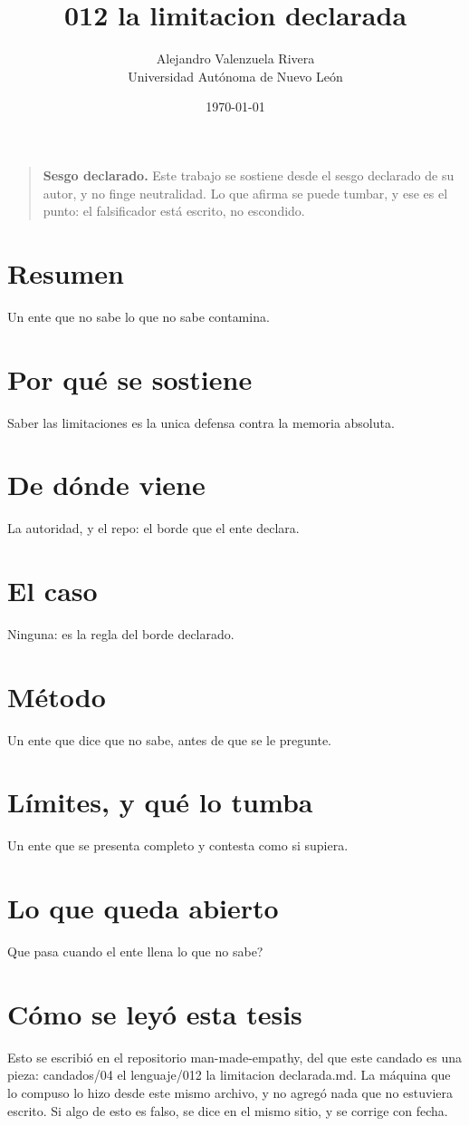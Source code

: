 \documentclass[11pt,a4paper]{article}
\title{012 la limitacion declarada}
\author{Alejandro Valenzuela Rivera\\\small Universidad Autónoma de Nuevo León}
\date{\today}
\begin{document}
\maketitle

\begin{quote}
\textbf{Sesgo declarado.} Este trabajo se sostiene desde el sesgo declarado de su autor, y no finge neutralidad. Lo que afirma se puede tumbar, y ese es el punto: el falsificador está escrito, no escondido.
\end{quote}

\section*{Resumen}
Un ente que no sabe lo que no sabe contamina.

\section{Por qué se sostiene}
Saber las limitaciones es la unica defensa contra la memoria absoluta.

\section{De dónde viene}
La autoridad, y el repo: el borde que el ente declara.

\section{El caso}
Ninguna: es la regla del borde declarado.

\section{Método}
Un ente que dice que no sabe, antes de que se le pregunte.

\section{Límites, y qué lo tumba}
Un ente que se presenta completo y contesta como si supiera.

\section{Lo que queda abierto}
\textquestiondown{}Que pasa cuando el ente llena lo que no sabe?

\section*{Cómo se leyó esta tesis}
Esto se escribió en el repositorio man-made-empathy, del que este candado es una pieza: candados/04 el lenguaje/012 la limitacion declarada.md. La máquina que lo compuso lo hizo desde este mismo archivo, y no agregó nada que no estuviera escrito. Si algo de esto es falso, se dice en el mismo sitio, y se corrige con fecha.
\end{document}
